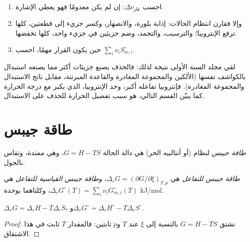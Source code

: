 \begin{method}\label{met:b2:reaction-free-energy:entropy-sign}
\begin{enumerate}
  \item احسب $\Delta\nu_{\text{غاز}}$: إن لم يكن معدومًا فهو يعطي
        الإشارة.
  \item وإلا فقارن انتظام الحالات: إذابة بلورة، والانصهار، وكسر جزيء إلى
        قطعتين، كلها ترفع الإنتروبيا؛ والترسيب، والتجمد، وضم جزيئين في
        جزيء واحد، كلها تخفضها.
  \item حين يكون القرار مهمًا، احسب $\sum_i\nu_iS^\circ_{m,i}$.
\end{enumerate}
\end{method}

لقي مجلد السنة الأولى نتيجة لذلك: فالحذف يصنع جزيئات أكثر مما يصنعه
استبدال بالكواشف نفسها (الألكين والمجموعة المغادرة والقاعدة المبرتنة،
مقابل ناتج الاستبدال والمجموعة المغادرة). فإنتروبيا تفاعله أكبر، وحد
الإنتروبيا، الذي يكبر مع درجة الحرارة كما يبيّن القسم التالي، هو سبب
تفضيل الحرارة للحذف على الاستبدال.

\section{طاقة جيبس}

\begin{definition}\label{def:b2:reaction-free-energy:gibbs-energy}
\emph{طاقة جيبس} لنظام (أو أنتالبيه الحر) هي دالة الحالة
$G = H - TS$، وهي ممتدة، وتقاس بالجول.
\end{definition}

\begin{definition}\label{def:b2:reaction-free-energy:reaction-gibbs}
\emph{طاقة جيبس للتفاعل} هي $\Delta_r G
= (\partial G/\partial\xi)_{T,p}$، و\emph{طاقة جيبس القياسية
للتفاعل} هي $\Delta_r G^\circ(T) =
\sum_i\nu_iG^\circ_{m,i}(T)$، وكلتاهما بوحدة \unit{kJ/mol}.
\end{definition}

\begin{proposition}\label{prop:b2:reaction-free-energy:g-h-s}
$\Delta_r G = \Delta_r H - T\Delta_r S$، و$\Delta_r G^\circ = \Delta_r
H^\circ - T\Delta_r S^\circ$.
\end{proposition}

\begin{proof}
نشتق $G = H - TS$ بالنسبة إلى $\xi$ عند $T$ و$p$ ثابتين: فالمقدار $T$
ثابت في هذا الاشتقاق.
\end{proof}


